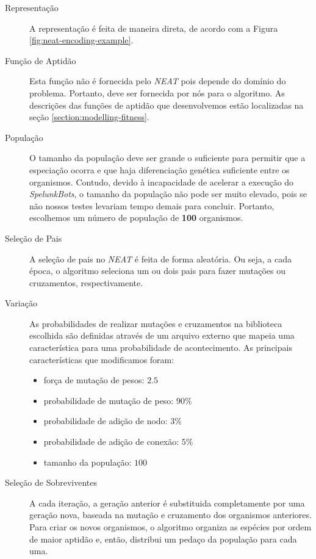 \begin{description}
	\item[Representação]
		A representação é feita de maneira direta, de acordo com a Figura
		\ref{fig:neat-encoding-example}.

	\item[Função de Aptidão]
		Esta função não é fornecida pelo \textit{NEAT} pois depende do domínio
		do problema. Portanto, deve ser fornecida por nós para o algoritmo. As
		descrições das funções de aptidão que desenvolvemos estão localizadas na
		seção \ref{section:modelling-fitness}.

	\item[População]
		O tamanho da população deve ser grande o suficiente para permitir que a
		especiação ocorra e que haja diferenciação genética suficiente entre os
		organismos. Contudo, devido à incapacidade de acelerar a execução do
		\textit{SpelunkBots}, o tamanho da população não pode ser muito elevado,
		pois se não nossos testes levariam tempo demais para concluir. Portanto,
		escolhemos um número de população de \textbf{100} organismos.

	\item[Seleção de Pais] A seleção de pais no \textit{NEAT} é feita de forma
		aleatória. Ou seja, a cada época, o algoritmo seleciona um ou dois pais
		para fazer mutações ou cruzamentos, respectivamente.

	\item[Variação] As probabilidades de realizar mutações e cruzamentos na
		biblioteca escolhida são definidas através de um arquivo externo que
		mapeia uma característica para uma probabilidade de acontecimento. As
		principais características que modificamos foram:
		\begin{itemize}
				\item força de mutação de pesos: $2.5$
				\item probabilidade de mutação de peso: $90\%$
				\item probabilidade de adição de nodo: $3\%$
				\item probabilidade de adição de conexão: $5\%$
				\item tamanho da população: $100$
		\end{itemize}

	\item[Seleção de Sobreviventes]
		A cada iteração, a geração anterior é substituida completamente por uma
		geração nova, baseada na mutação e cruzamento dos organismos anteriores.
		Para criar os novos organismos, o algoritmo organiza as espécies por
		ordem de maior aptidão e, então, distribui um pedaço da população para
		cada uma.

\end{description}

